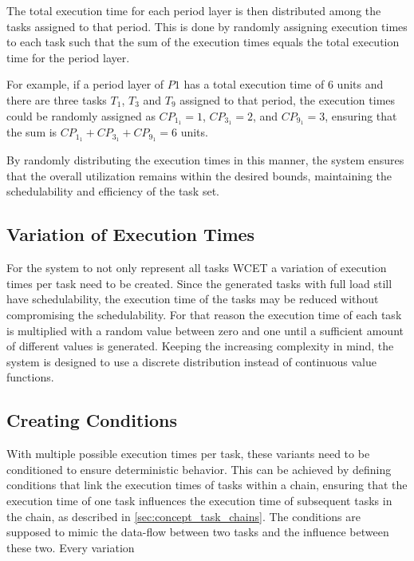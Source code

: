 The total execution time for each period layer is then distributed among the tasks assigned to that period. This is done by randomly assigning execution times to each task such that the sum of the execution times equals the total execution time for the period layer.

For example, if a period layer of $P1$ has a total execution time of $6$ units and there are three tasks $T_1$, $T_3$ and $T_9$ assigned to that period, the execution times could be randomly assigned as $CP_{1_1} = 1$, $CP_{3_1} = 2$, and $CP_{9_1} = 3$, ensuring that the sum is \( CP_{1_1} + CP_{3_1} + CP_{9_1} = 6 \) units.

By randomly distributing the execution times in this manner, the system ensures that the overall utilization remains within the desired bounds, maintaining the schedulability and efficiency of the task set.

\subsection{Variation of Execution Times}\label{sec:concept_lower_execution_times}
For the system to not only represent all tasks \ac{WCET} a variation of execution times per task need to be created.
Since the generated tasks with full load still have schedulability, the execution time of the tasks may be reduced without compromising the schedulability.
For that reason the execution time of each task is multiplied with a random value between zero and one until a sufficient amount of different values is generated.
Keeping the increasing complexity in mind, the system is designed to use a discrete distribution instead of continuous value functions. 


\subsection{Creating Conditions}\label{sec:creating_conditions}
With multiple possible execution times per task, these variants need to be conditioned to ensure deterministic behavior.
This can be achieved by defining conditions that link the execution times of tasks within a chain, ensuring that the execution time of one task influences the execution time of subsequent tasks in the chain, as described in \cref{sec:concept_task_chains}.
The conditions are supposed to mimic the data-flow between two tasks and the influence between these two.
Every variation

